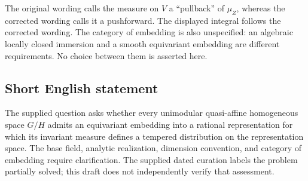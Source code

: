 \documentclass[11pt]{article}
\begin{document}
The original wording calls the measure on \(V\) a ``pullback'' of \(\mu_Z\), whereas the corrected wording calls it a pushforward. The displayed integral follows the corrected wording. The category of embedding is also unspecified: an algebraic locally closed immersion and a smooth equivariant embedding are different requirements. No choice between them is asserted here.
\subsection{Short English statement}
The supplied question asks whether every unimodular quasi-affine homogeneous space \(G/H\) admits an equivariant embedding into a rational representation for which its invariant measure defines a tempered distribution on the representation space. The base field, analytic realization, dimension convention, and category of embedding require clarification. The supplied dated curation labels the problem partially solved; this draft does not independently verify that assessment.
\end{document}
